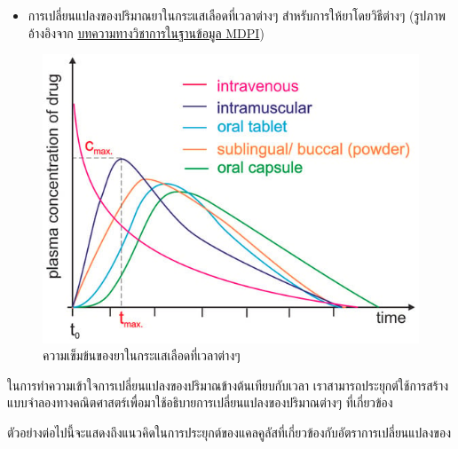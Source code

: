 \documentclass[landscape, 20pt]{extarticle}
\providecommand{\tightlist}{%
  \setlength{\itemsep}{0pt}\setlength{\parskip}{0pt}}
\theoremstyle{definition}
\theoremstyle{remark}
\begin{document}
\begin{itemize}
\tightlist
\item
  การเปลี่ยนแปลงของปริมาณยาในกระแสเลือดที่เวลาต่างๆ สำหรับการให้ยาโดยวิธีต่างๆ (รูปภาพอ้างอิงจาก \href{https://www.mdpi.com/1420-3049/28/24/8038}{บทความทางวิชาการในฐานข้อมูล MDPI})
\end{itemize}

\begin{figure}
\includegraphics[width=1\linewidth]{fig-drug-absorption} \caption{ความเข็มข้นของยาในกระแสเลือดที่เวลาต่างๆ }\label{fig:fig-drug-absorption}
\end{figure}

ในการทำความเข้าใจการเปลี่ยนแปลงของปริมาณข้างต้นเทียบกับเวลา เราสามารถประยุกต์ใช้การสร้างแบบจำลองทางคณิตศาสตร์เพื่อมาใช้อธิบายการเปลี่ยนแปลงของปริมาณต่างๆ ที่เกี่ยวข้อง



ตัวอย่างต่อไปนี้จะแสดงถึงแนวคิดในการประยุกต์ของแคลคูลัสที่เกี่ยวข้องกับอัตราการเปลี่ยนแปลงของ
\end{document}
